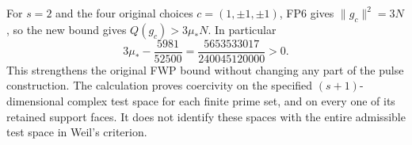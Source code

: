 For \(s=2\) and the four original choices \(c=(1,\pm1,\pm1)\),
FP6 gives \(\|g_c\|^2=3N\), so the new bound gives
\(Q(g_c)>3\mu_*N\). In particular
\[
 3\mu_*-\frac{5981}{52500}
 =\frac{5653533017}{240045120000}>0.
 \tag{FP44}\label{fp:fpb:old-comparison}
\]
This strengthens the original FWP bound without changing any
part of the pulse construction. The calculation proves coercivity
on the specified \((s+1)\)-dimensional complex test space for each
finite prime set, and on every one of its retained support faces.
It does not identify these spaces with the entire admissible
test space in Weil's criterion.

